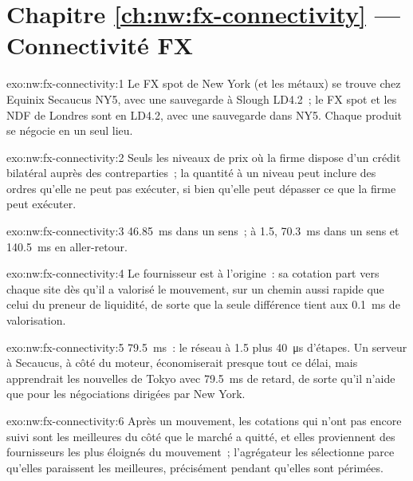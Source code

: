 \section*{Chapitre \ref{ch:nw:fx-connectivity} --- Connectivité FX}

\begin{solution}{exo:nw:fx-connectivity:1}
Le FX spot de New York (et les métaux) se trouve chez Equinix Secaucus NY5, avec une sauvegarde à Slough LD4.2~; le FX spot et les NDF de Londres sont en LD4.2, avec une sauvegarde
dans NY5. Chaque produit se négocie en un seul lieu.
\end{solution}

\begin{solution}{exo:nw:fx-connectivity:2}
Seuls les niveaux de prix où la firme dispose d'un crédit bilatéral auprès des contreparties~; la quantité à un niveau peut inclure des ordres
qu'elle ne peut pas exécuter, si bien qu'elle peut dépasser ce que la firme peut exécuter.
\end{solution}

\begin{solution}{exo:nw:fx-connectivity:3}
\qty{46.85}{\milli\second} dans un sens~; à 1.5, \qty{70.3}{\milli\second} dans un sens et \qty{140.5}{\milli\second} en aller-retour.
\end{solution}

\begin{solution}{exo:nw:fx-connectivity:4}
Le fournisseur est à l'origine~: sa cotation part vers chaque site dès qu'il a valorisé le mouvement, sur un chemin aussi rapide que celui du preneur de liquidité, de sorte que
la seule différence tient aux \qty{0.1}{\milli\second} de valorisation.
\end{solution}

\begin{solution}{exo:nw:fx-connectivity:5}
\qty{79.5}{\milli\second}~: le réseau à 1.5 plus \qty{40}{\micro\second} d'étapes. Un serveur à Secaucus, à côté du moteur, économiserait
presque tout ce délai, mais apprendrait les nouvelles de Tokyo avec \qty{79.5}{\milli\second} de retard, de sorte qu'il n'aide que pour les négociations dirigées par New York.
\end{solution}

\begin{solution}{exo:nw:fx-connectivity:6}
Après un mouvement, les cotations qui n'ont pas encore suivi sont les meilleures du côté que le marché a quitté, et elles proviennent des fournisseurs
les plus éloignés du mouvement~; l'agrégateur les sélectionne parce qu'elles paraissent les meilleures, précisément pendant qu'elles sont périmées.
\end{solution}

